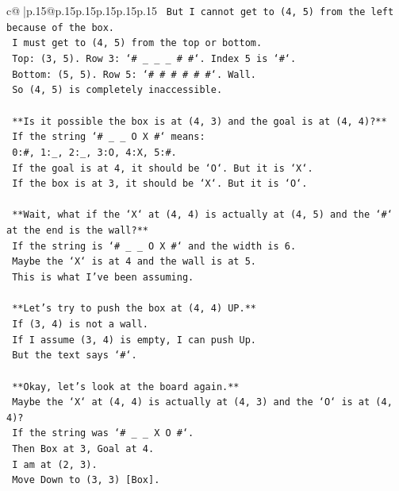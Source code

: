 \documentclass{article}
\begin{document}
{\begin{supertabular}{c@{$\;$}|p{.15\linewidth}@{}p{.15\linewidth}p{.15\linewidth}p{.15\linewidth}p{.15\linewidth}p{.15\linewidth}}
{{{\texttt{    But I cannot get to (4, 5) from the left because of the box.} \\
\texttt{    I must get to (4, 5) from the top or bottom.} \\
\texttt{    Top: (3, 5). Row 3: `\# \_ \_ \_ \# \#`. Index 5 is `\#`.} \\
\texttt{    Bottom: (5, 5). Row 5: `\# \# \# \# \# \#`. Wall.} \\
\texttt{    So (4, 5) is completely inaccessible.} \\
\\ 
\texttt{    **Is it possible the box is at (4, 3) and the goal is at (4, 4)?**} \\
\texttt{    If the string `\# \_ \_ O X \#` means:} \\
\texttt{    0:\#, 1:\_, 2:\_, 3:O, 4:X, 5:\#.} \\
\texttt{    If the goal is at 4, it should be `O`. But it is `X`.} \\
\texttt{    If the box is at 3, it should be `X`. But it is `O`.} \\
\\ 
\texttt{    **Wait, what if the `X` at (4, 4) is actually at (4, 5) and the `\#` at the end is the wall?**} \\
\texttt{    If the string is `\# \_ \_ O X \#` and the width is 6.} \\
\texttt{    Maybe the `X` is at 4 and the wall is at 5.} \\
\texttt{    This is what I've been assuming.} \\
\\ 
\texttt{    **Let's try to push the box at (4, 4) UP.**} \\
\texttt{    If (3, 4) is not a wall.} \\
\texttt{    If I assume (3, 4) is empty, I can push Up.} \\
\texttt{    But the text says `\#`.} \\
\\ 
\texttt{    **Okay, let's look at the board again.**} \\
\texttt{    Maybe the `X` at (4, 4) is actually at (4, 3) and the `O` is at (4, 4)?} \\
\texttt{    If the string was `\# \_ \_ X O \#`.} \\
\texttt{    Then Box at 3, Goal at 4.} \\
\texttt{    I am at (2, 3).} \\
\texttt{    Move Down to (3, 3) {[}Box{]}.} \\
}}}
\end{supertabular}}
\end{document}
